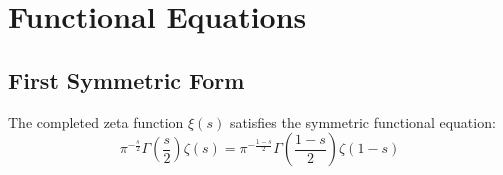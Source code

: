 \documentclass[a4paper]{article}
\begin{document}


\section{Functional Equations}\label{zf:sec:functional-equations}

\subsection{First Symmetric Form}\label{zf:subsec:first-symmetric-form}

\begin{theorem}\label{zf:thm:symmetric-functional-equation}
The completed zeta function $\xi(s)$ satisfies the symmetric functional equation:
\begin{equation} 
\boxed{
\pi^{-\frac{s}{2}} \Gamma\left(\frac{s}{2}\right) \zeta(s) = \pi^{- \frac{1-s}{2}} \Gamma\left(\frac{1-s}{2}\right) \zeta(1-s)
}
\end{equation}
\end{theorem}
\end{document}

